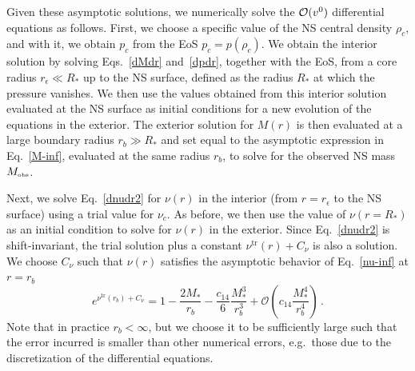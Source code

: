\documentclass[prd,aps,twocolumn,nofootinbib,showpacs,superscriptaddress]{revtex4-1}
\newcommand\be{\begin{equation}}
\newcommand\ee{\end{equation}}
\newcommand{\obs}{{\mbox{\tiny obs}}}
\newcommand{\mrm}{\mathrm}
\begin{document}
Given these asymptotic solutions, we numerically solve the
${\cal{O}}(v^{0})$ differential equations as follows. First, we choose
a specific value of the NS central density $\rho_c$, and with it, we
obtain $p_c$ from the EoS $p_c = p(\rho_c)$. We obtain the interior
solution by solving Eqs.~\eqref{dMdr} and~\eqref{dpdr}, together with
the EoS, from a core radius $r_\epsilon \ll R_*$ up to the NS surface,
defined as the radius $R_*$ at which the pressure vanishes. We then use
the values obtained from this interior solution evaluated at the NS
surface as initial conditions for a new evolution of the equations in
the exterior. The exterior solution for $M(r)$ is then evaluated at a
large boundary radius $r_b \gg R_*$ and set equal to the asymptotic
expression in Eq.~\eqref{M-inf}, evaluated at the same radius $r_{b}$, 
to solve for the observed NS mass $M_{\obs}$.

Next, we solve Eq.~\eqref{dnudr2} for $\nu(r)$ in the interior (from
$r=r_\epsilon$ to the NS surface) using a trial value for $\nu_c$. As
before, we then use the value of $\nu(r=R_*)$ as an initial condition to
solve for $\nu(r)$ in the exterior. Since Eq.~\eqref{dnudr2} is
shift-invariant, the trial solution plus a constant
$\nu^\mrm{tr}(r)+C_\nu$ is also a solution. We choose $C_\nu$ such
that $\nu(r)$ satisfies the asymptotic behavior of Eq.~\eqref{nu-inf}
at $r=r_b$~\cite{yunes-CSNS,Yagi:2013mbt}
%
\be e^{\nu^\mrm{tr}(r_b) + C_\nu} =  1 -\frac{2
  M_*}{r_b}-\frac{c_{14}}{6} \frac{M_*^3}{r_b^3}  + \mathcal{O} \left(
c_{14} \frac{M_*^4}{r_b^4} \right)\,.  \ee
%  
Note that in practice $r_{b} < \infty$, but we choose it to be
sufficiently large such that the error incurred is smaller than other
numerical errors, e.g.~those due to the discretization of the differential
equations. 
\end{document}
